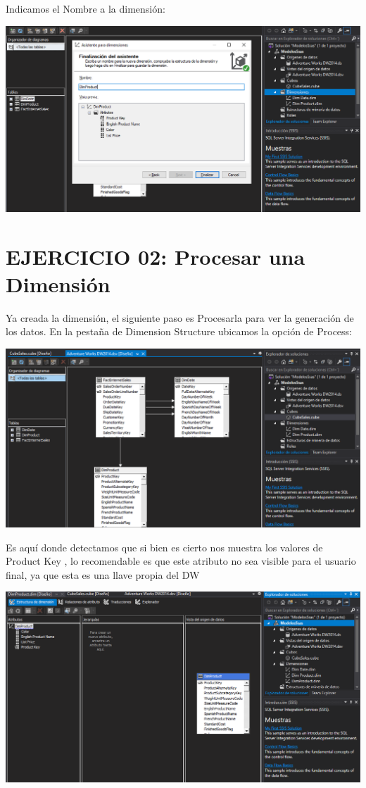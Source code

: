Indicamos el Nombre a la dimensión:
\begin{center}
\includegraphics[width=\columnwidth]{images/task1/6}\newline
\end{center}


\section{EJERCICIO 02: Procesar una Dimensión} 

Ya creada la dimensión, el siguiente paso es Procesarla para ver la generación de los datos. En la pestaña de Dimension Structure ubicamos la opción de Process:
\begin{center}
\includegraphics[width=\columnwidth]{images/task1/1}\newline
\end{center}


Es aquí donde detectamos que si bien es cierto nos muestra los valores de Product Key , lo recomendable es que este atributo no sea visible para el usuario final, ya que esta es una llave propia del DW
\begin{center}
\includegraphics[width=\columnwidth]{images/task1/7}\newline
\end{center}

